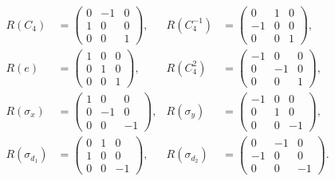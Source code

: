\begin{subequations}
    \label{eq:Group:Symm:dRepresentation}
    \begin{align}
        \label{eq:Group:Symm:dRepresentation:C4}
        R(C_4) &= 
        \begin{pmatrix}
            0 & -1 & 0\\
            1 & 0 & 0\\
            0 & 0 & 1
        \end{pmatrix}, & R(C_4^{-1}) &= 
        \begin{pmatrix}
            0 & 1 & 0\\
            -1 & 0 & 0\\
            0 & 0 & 1
        \end{pmatrix},\\
        R(e) &= 
        \begin{pmatrix}
            1 & 0 & 0\\
            0 & 1 & 0\\
            0 & 0 & 1
        \end{pmatrix}, & R(C_4^2) &=
        \begin{pmatrix}
            -1 & 0 & 0\\
            0 & -1 & 0\\
            0 & 0 & 1
        \end{pmatrix},\\
        R(\sigma_x) &= 
        \begin{pmatrix}
            1 & 0 & 0\\
            0 & -1 & 0\\
            0 & 0 & -1
        \end{pmatrix}, & R(\sigma_y) &=
        \begin{pmatrix}
            -1 & 0 & 0\\
            0 & 1 & 0\\
            0 & 0 & -1
        \end{pmatrix},\\
        R(\sigma_{d_1}) &=
        \begin{pmatrix}
            0 & 1 & 0\\
            1 & 0 & 0\\
            0 & 0 & -1
        \end{pmatrix}, & R(\sigma_{d_2}) &=
        \begin{pmatrix}
            0 & -1 & 0\\
            -1 & 0 & 0\\
            0 & 0 & -1
        \end{pmatrix}.
    \end{align}
\end{subequations}


